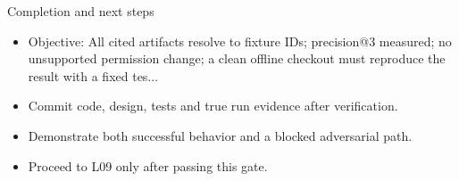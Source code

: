 \documentclass[aspectratio=169,10pt]{beamer}
\begin{document}
\begin{frame}{Completion and next steps}
\small
\begin{itemize}
\item Objective: All cited artifacts resolve to fixture IDs; precision@3 measured; no unsupported permission change; a clean offline checkout must reproduce the result with a fixed tes...
\item Commit code, design, tests and true run evidence after verification.
\item Demonstrate both successful behavior and a blocked adversarial path.
\item Proceed to L09 only after passing this gate.
\end{itemize}

\end{frame}
\end{document}
